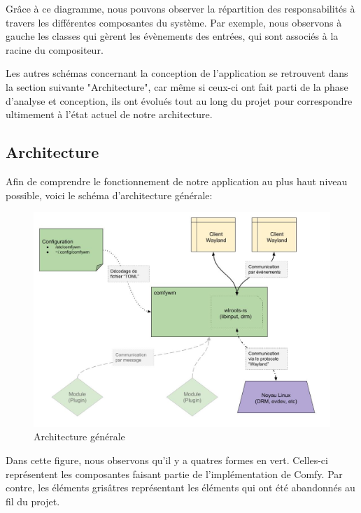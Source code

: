 \documentclass[titlepage]{article}
\begin{document}
\par
Grâce à ce diagramme, nous pouvons observer la répartition des responsabilités à
travers les différentes composantes du système. Par exemple, nous observons à
gauche les classes qui gèrent les évènements des entrées, qui sont associés à la
racine du compositeur.
\bigskip

\par
Les autres schémas concernant la conception de l'application se retrouvent dans
la section suivante "Architecture", car même si ceux-ci ont fait parti de la
phase d'analyse et conception, ils ont évolués tout au long du projet pour
correspondre ultimement à l'état actuel de notre architecture.
\bigskip

\subsection{Architecture}
\par
Afin de comprendre le fonctionnement de notre application au plus haut niveau
possible, voici le schéma d'architecture générale:
\bigskip

\begin{figure}[H]
	\centering
	\includegraphics[width=\textwidth]{architecture_generale_v1.jpg}
	\caption{Architecture générale}
\end{figure}

\par
Dans cette figure, nous observons qu'il y a quatres formes en vert. Celles-ci
représentent les composantes faisant partie de l'implémentation de Comfy. Par
contre, les éléments grisâtres représentant les éléments qui ont été abandonnés
au fil du projet.
\bigskip
\end{document}
